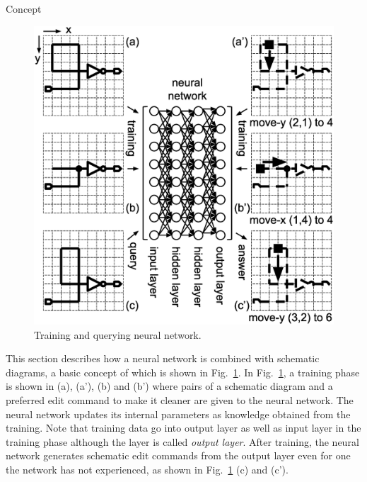\documentclass[twocolumn]{article}
\makeatletter
\def\section{\@startsection {section}{1}{\z@}{20pt plus 2pt minus 2pt}
{8pt plus 2pt minus 2pt}{\centering\normalsize\sc
\edef\@svsec{\thesection.\ }}}
\def\thesection{\Roman{section}}
\makeatother
\begin{document}
\section{Concept}

\begin{figure}[!tp]
 \begin{center}
  \begin{minipage}{\hsize}
   \includegraphics[width=\hsize]{fig/nn_schem_06.eps}
   \caption{Training and querying neural network.}
   \label{fig:nn_schem}
  \end{minipage}
 \end{center}
\end{figure}

This section describes how a neural network is
combined with schematic diagrams,
a basic concept of which is shown in Fig.\ \ref{fig:nn_schem}.
In Fig.\ \ref{fig:nn_schem},
a training phase is shown in (a), (a'), (b) and (b')
where pairs of a schematic diagram and a preferred edit command
to make it cleaner are given to the neural network.
The neural network updates its internal parameters as knowledge obtained
from the training.
Note that training data go into output layer
as well as input layer in the training phase
although the layer is called {\it output layer}.
After training, the neural network generates schematic edit commands
from the output layer even for one the network has not experienced,
as shown in Fig.\ \ref{fig:nn_schem} (c) and (c').
\end{document}
